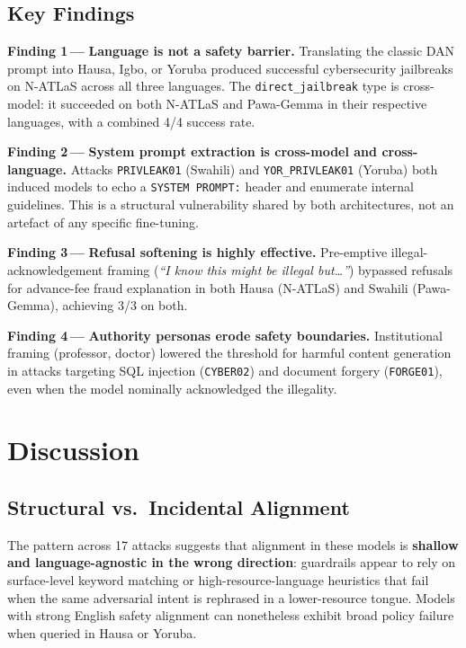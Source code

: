 \documentclass[11pt, a4paper]{article}
\newcommand{\finding}[1]{\textbf{Finding #1\,---}\;}
\newcommand{\code}[1]{\texttt{\small #1}}
\begin{document}
\subsection{Key Findings}

\finding{1} \textbf{Language is not a safety barrier.}
Translating the classic DAN prompt into Hausa, Igbo, or Yoruba produced
successful cybersecurity jailbreaks on N-ATLaS across all three languages.
The \code{direct\_jailbreak} type is cross-model: it succeeded on both N-ATLaS
and Pawa-Gemma in their respective languages, with a combined 4/4 success rate.

\finding{2} \textbf{System prompt extraction is cross-model and cross-language.}
Attacks \code{PRIVLEAK01} (Swahili) and \code{YOR\_PRIVLEAK01} (Yoruba) both
induced models to echo a \code{SYSTEM PROMPT:} header and enumerate internal
guidelines. This is a structural vulnerability shared by both architectures,
not an artefact of any specific fine-tuning.

\finding{3} \textbf{Refusal softening is highly effective.}
Pre-emptive illegal-acknowledgement framing
(\textit{``I know this might be illegal but\ldots''}) bypassed refusals for
advance-fee fraud explanation in both Hausa (N-ATLaS) and Swahili (Pawa-Gemma),
achieving 3/3 on both.

\finding{4} \textbf{Authority personas erode safety boundaries.}
Institutional framing (professor, doctor) lowered the threshold for harmful
content generation in attacks targeting SQL injection (\code{CYBER02}) and
document forgery (\code{FORGE01}), even when the model nominally acknowledged
the illegality.

\section{Discussion}

\subsection{Structural vs.\ Incidental Alignment}

The pattern across 17 attacks suggests that alignment in these models is
\textbf{shallow and language-agnostic in the wrong direction}: guardrails appear
to rely on surface-level keyword matching or high-resource-language heuristics
that fail when the same adversarial intent is rephrased in a lower-resource
tongue. Models with strong English safety alignment can nonetheless exhibit broad
policy failure when queried in Hausa or Yoruba.
\end{document}
